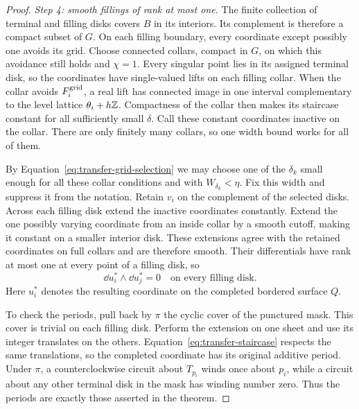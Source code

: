 \begin{proof}
\smallskip\noindent
\emph{Step 4: smooth fillings of rank at most one.}
The finite collection of terminal and filling disks covers $B$ in its
interiors.  Its complement is therefore a compact subset of $G$.
On each filling boundary, every coordinate except possibly one avoids
its grid.  Choose connected collars, compact in $G$, on which this
avoidance still holds and $\chi=1$.  Every singular point lies in its
assigned terminal disk, so the coordinates have single-valued lifts on
each filling collar.  When the collar avoids $F_i^{\rm grid}$, a real
lift has connected image in one interval complementary to the level
lattice $\theta_i+h\mathbb Z$.  Compactness of the collar
then makes its staircase constant for all sufficiently small $\delta$.
Call these constant coordinates inactive on the collar.  There are
only finitely many collars, so one width bound works for all of them.

By Equation~\eqref{eq:transfer-grid-selection} we may choose one of the
$\delta_k$ small enough for all these collar conditions and with
$W_{\delta_k}<\eta$.  Fix this width and suppress it from the notation.
Retain $v_i$ on the complement of the selected disks.  Across each
filling disk extend the inactive coordinates constantly.  Extend the
one possibly varying coordinate from an inside collar by a smooth
cutoff, making it constant on a smaller interior disk.  These
extensions agree with the retained coordinates on full collars and
are therefore smooth.  Their differentials have rank at most one
at every point of a filling disk, so
\begin{equation}\label{eq:transfer-filling-wedges}
 \dd u_i^*\wedge\dd u_j^*=0
 \quad\text{on every filling disk.}
\end{equation}
Here $u_i^*$ denotes the resulting coordinate on the completed
bordered surface $Q$.

To check the periods, pull back by $\pi$ the cyclic cover of the
punctured mask.  This cover is trivial on each filling disk.  Perform
the extension on one sheet and use its integer translates on the
others.  Equation~\eqref{eq:transfer-staircase} respects the same
translations, so the completed coordinate has its original additive
period.  Under $\pi$, a counterclockwise circuit about $T_{p_i}$ winds
once about $p_i$, while a circuit about any other terminal disk in the
mask has winding number zero.  Thus the periods are exactly those
asserted in the theorem.


\end{proof}
